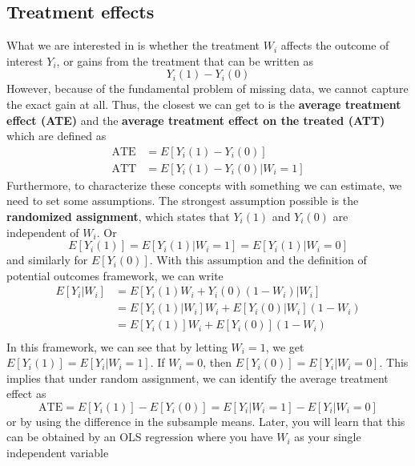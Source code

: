 \documentclass[12pt]{article}
\theoremstyle{definition}
\theoremstyle{property}
\theoremstyle{assumption}
\theoremstyle{example}
\theoremstyle{comment}
\begin{document}
\subsection{Treatment effects}
What we are interested in is whether the treatment $W_i$ affects the outcome of interest $Y_i$, or gains from the treatment that can be written as
\[
Y_i(1)-Y_i(0)
\]
However, because of the fundamental problem of missing data, we cannot capture the exact gain at all. Thus, the closest we can get to is the \textbf{average treatment effect (ATE)} and the \textbf{average treatment effect on the treated (ATT)} which are defined as
\[
\begin{aligned}
\text{ATE}&=E[Y_i(1)-Y_i(0)]\\
\text{ATT}&=E[Y_i(1)-Y_i(0)|W_i=1]
\end{aligned}
\]
Furthermore, to characterize these concepts with something we can estimate, we need to set some assumptions. The strongest assumption possible is the \textbf{randomized assignment}, which states that $Y_i(1)$ and $Y_i(0)$ are independent of $W_i$. Or
\[
E[Y_i(1)]= E[Y_i(1)|W_i=1]=E[Y_i(1)|W_i=0]
\]
and similarly for $E[Y_i(0)]$. With this assumption and the definition of potential outcomes framework, we can write
\[
\begin{aligned}
E[Y_i|W_i]&=E[Y_i(1)W_i + Y_i(0)(1-W_i)|W_i]\\
&=E[Y_i(1)|W_i]W_i+E[Y_i(0)|W_i](1-W_i)\\
&=E[Y_i(1)]W_i+E[Y_i(0)](1-W_i)\\
\end{aligned}
\]
In this framework, we can see that by letting $W_i=1$, we get $E[Y_i(1)]=E[Y_i|W_i=1]$. If $W_i=0$, then $E[Y_i(0)]=E[Y_i|W_i=0]$. This implies that under random assignment, we can identify the average treatment effect as
\[
\text{ATE}=E[Y_i(1)]-E[Y_i(0)] = E[Y_i|W_i=1]-E[Y_i|W_i=0]
\]
or by using the difference in the subsample means. Later, you will learn that this can be obtained by an OLS regression where you have $W_i$ as your single independent variable
\par

\end{document}
